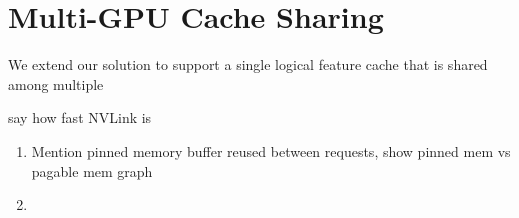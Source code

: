 \section{Multi-GPU Cache Sharing} \label{Design: Multi-GPU}
We extend our solution to support a single logical feature cache that is shared among multiple 

say how fast NVLink is

\begin{enumerate}
    \item Mention pinned memory buffer reused between requests, show pinned mem vs pagable mem graph
    \item 
\end{enumerate}